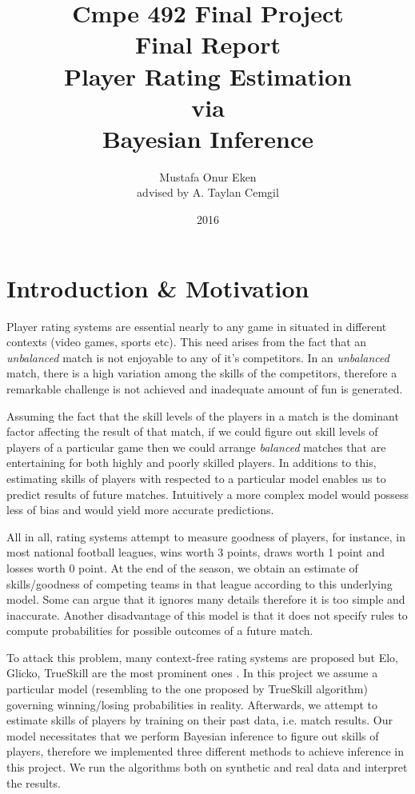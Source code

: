 \documentclass[12pt]{article}
\title{Cmpe 492  Final Project \\[1mm] Final Report \\[60mm] Player Rating Estimation\\ via \\[3mm] Bayesian Inference}
\author{Mustafa Onur Eken\\ advised by A. Taylan Cemgil}
\date{2016}
\begin{document}
\maketitle
\thispagestyle{empty}
\newpage

\pagebreak
\tableofcontents

\pagebreak





%
%
\section{Introduction \& Motivation}

Player rating systems are essential nearly to any game in situated in different contexts (video games, sports etc). This need arises from the fact that an \textit{unbalanced} match is not enjoyable to any of it's competitors. In an \textit{unbalanced}  match, there is a high variation among the skills of the competitors, therefore a remarkable challenge is not achieved and inadequate amount of fun is generated.

Assuming the fact that the skill levels of the players in a match is the dominant factor affecting the result of that match, if we could figure out skill levels of players of a particular game then we could arrange \textit{balanced} matches that are entertaining for both highly and poorly skilled players. In additions to this, estimating skills of players with respected to a particular model enables us to predict results of future matches. Intuitively a more complex model would possess less of bias and would yield more accurate predictions.

 All in all, rating systems attempt to measure goodness of players, for instance, in most national football leagues, wins worth 3 points, draws worth 1 point and losses worth 0 point. At the end of the season, we obtain an estimate of skills/goodness of competing teams in that league according to this underlying model. Some can argue that it ignores many details therefore it is too simple and inaccurate. Another disadvantage of this model is that it does not specify rules to compute probabilities for possible outcomes of a future match. 
 
 To attack this problem, many context-free rating systems are proposed but Elo, Glicko, TrueSkill are the most prominent ones \cite{minka2006trueskill}. In this project we assume a particular model (resembling to the one proposed by TrueSkill algorithm) governing winning/losing probabilities in reality. Afterwards, we attempt to estimate skills of players by training on their past data, i.e. match results. Our model necessitates that we perform Bayesian inference to figure out skills of players, therefore we implemented three different methods to achieve inference in this project. We run the algorithms both on synthetic and real data and interpret the results.
 
\end{document}
